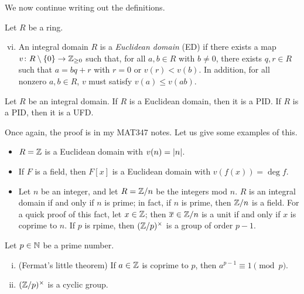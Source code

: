 We now continue writing out the definitions.
\begin{definition} \label{defn:class_conventions_2}
    Let $R$ be a ring.
    \begin{enumerate}[(i)] \setcounter{enumi}{5}
        \item An integral domain $R$ is a \textit{Euclidean domain} (ED) if there exists a map $v \colon R \setminus \{0\} \to \mathbb Z_{\geq 0}$ such that, for all $a, b \in R$ with $b \neq 0$, there exists $q, r \in R$ such that $a = bq + r$ with $r = 0$ or $v(r) < v(b)$. In addition, for all nonzero $a, b \in R$, $v$ must satisfy $v(a) \leq v(ab)$.%
    \end{enumerate}
\end{definition}

\begin{theorem} \label{thm:ed_is_pid_is_ufd}
    Let $R$ be an integral domain. If $R$ is a Euclidean domain, then it is a PID. If $R$ is a PID, then it is a UFD.
\end{theorem}
Once again, the proof is in my MAT347 notes. Let us give some examples of this.
\begin{itemize}
    \item $R = \mathbb Z$ is a Euclidean domain with $v(n) = \left\lvert n \right\rvert$.
    \item If $F$ is a field, then $F[x]$ is a Euclidean domain with $v(f(x)) = \deg f$.
    \item Let $n$ be an integer, and let $R = \mathbb Z/n$ be the integers mod $n$. $R$ is an integral domain if and only if $n$ is prime; in fact, if $n$ is prime, then $\mathbb Z/n$ is a field. For a quick proof of this fact, let $x \in \mathbb Z$; then $\overline x \in \mathbb Z/n$ is a unit if and only if $x$ is coprime to $n$. If $p$ is rpime, then $(\mathbb Z/p)^\times$ is a group of order $p-1$.
\end{itemize}

\begin{theorem} \label{thm:prime_number_properties}
    Let $p \in \mathbb N$ be a prime number.
    \begin{enumerate}[(i)]
        \item (Fermat's little theorem) If $a \in \mathbb Z$ is coprime to $p$, then $a^{p-1} \equiv 1 \pmod{p}$.
        \item $(\mathbb Z/p)^\times$ is a cyclic group.
    \end{enumerate}
\end{theorem}

